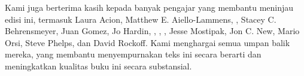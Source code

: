 \noindent%
Kami juga berterima kasih kepada banyak pengajar yang membantu meninjau
edisi ini, termasuk
Laura Acion,
    {Matthew E. Aiello-Lammens},
,
Stacey C. Behrensmeyer,
Juan Gomez,
Jo Hardin,
,
,
,
Jesse Mostipak,
Jon C. New,
Mario Orsi,
Steve Phelps,
dan David Rockoff.
Kami menghargai semua umpan balik mereka, yang membantu
menyempurnakan teks ini secara berarti dan meningkatkan
kualitas buku ini secara substansial.
